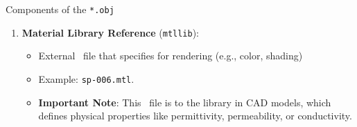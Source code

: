 \begin{frame}{Components of the \texttt{*.obj}}
    \begin{enumerate}
         \setcounter{enumi}{\value{listnumber}}
        \item \textbf{Material Library Reference} (\texttt{mtllib}):

        \begin{itemize}
        		\item External \mtl \ file that specifies  for rendering (e.g., color, shading) %
        		\item Example: \texttt{sp-006.mtl}.
        		\item \textbf{Important Note}:  
              	This \mtl \ file is  to the  library in CAD models, which defines physical properties like permittivity, permeability, or conductivity.%
    \end{itemize}
    \end{enumerate}
\end{frame}

